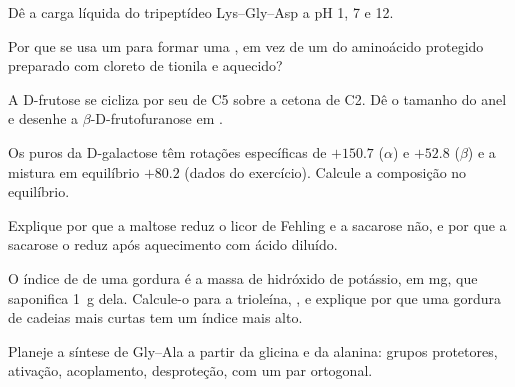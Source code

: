 \begin{exercise}[$\star\star$]\label{exo:b2:biomolecules:5}
Dê a carga líquida do tripeptídeo Lys--Gly--Asp a pH 1, 7 e 12.
\end{exercise}

\begin{exercise}[$\star\star$]\label{exo:b2:biomolecules:6}
Por que se usa um  para formar uma , em vez de um 
do aminoácido protegido preparado com cloreto de tionila e aquecido?
\end{exercise}

\begin{exercise}[$\star\star$]\label{exo:b2:biomolecules:7}
A D-frutose se cicliza por seu  de C5 sobre a cetona de C2. Dê o tamanho do anel e desenhe a
$\beta$-D-frutofuranose em .
\end{exercise}

\begin{exercise}[$\star\star$]\label{exo:b2:biomolecules:8}
Os  puros da D-galactose têm rotações específicas de $+150.7$ ($\alpha$) e $+52.8$ ($\beta$) e
a mistura em equilíbrio $+80.2$ (dados do exercício). Calcule a composição no equilíbrio.
\end{exercise}

\begin{exercise}[$\star\star$]\label{exo:b2:biomolecules:9}
Explique por que a maltose reduz o licor de Fehling e a sacarose não, e por que a sacarose o reduz após
aquecimento com ácido diluído.
\end{exercise}

\begin{exercise}[$\star\star\star$]\label{exo:b2:biomolecules:10}
O índice de  de uma gordura é a massa de hidróxido de potássio, em mg, que saponifica 1~g
dela. Calcule-o para a trioleína, , e explique por que uma gordura de cadeias mais curtas
tem um índice mais alto.
\end{exercise}

\begin{exercise}[$\star\star\star$]\label{exo:b2:biomolecules:11}
Planeje a síntese de Gly--Ala a partir da glicina e da alanina: grupos protetores, ativação, acoplamento,
desproteção, com um par ortogonal.
\end{exercise}

